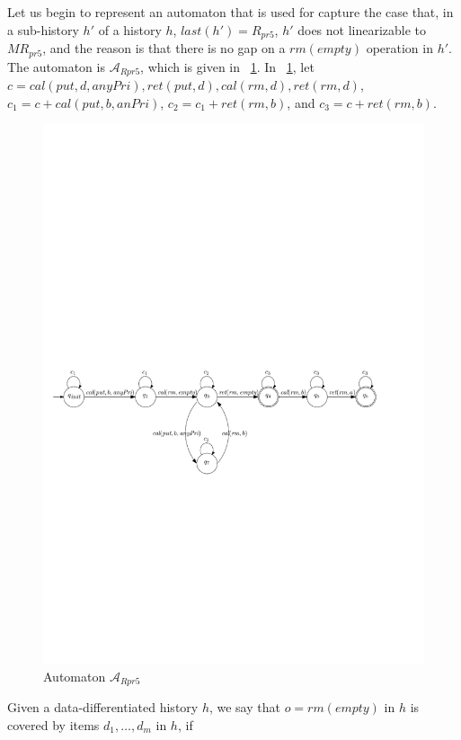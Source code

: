 \documentclass{llncs}
\begin{document}
Let us begin to represent an automaton that is used for capture the case that, in a sub-history $h'$ of a history $h$, $\textit{last}(h')=R_{\textit{pr5}}$, $h'$ does not linearizable to $\textit{MR}_{\textit{pr5}}$, and the reason is that there is no gap on a $\textit{rm}(\textit{empty})$ operation in $h'$. The automaton is $\mathcal{A}_{\textit{Rpr5}}$, which is given in \figurename~\ref{fig:automata for Rpr5}. In \figurename~\ref{fig:automata for Rpr5}, let $c = \textit{cal}(\textit{put},d,\textit{anyPri}),\textit{ret}(\textit{put},d), \textit{cal}(\textit{rm},d), \textit{ret}(\textit{rm},d)$, $c_1 = c + \textit{cal}(\textit{put},b,\textit{anPri})$, $c_2 = c_1 + \textit{ret}(\textit{rm},b)$, and $c_3 = c + \textit{ret}(\textit{rm},b)$.

\begin{figure}[htbp]
  \centering
  \includegraphics[width=0.8 \textwidth]{PIC_AUTO_Rpr5.pdf}
  \caption{Automaton $\mathcal{A}_{\textit{Rpr5}}$}
  \label{fig:automata for Rpr5}
\end{figure}

Given a data-differentiated history $h$, we say that $o = \textit{rm}(\textit{empty})$ in $h$ is covered by items $d_1,\ldots,d_m$ in $h$, if
\end{document}
